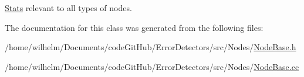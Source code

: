 \hyperlink{class_stats}{Stats} relevant to all types of nodes. 



The documentation for this class was generated from the following files\+:\begin{DoxyCompactItemize}
\item 
/home/wilhelm/\+Documents/code\+Git\+Hub/\+Error\+Detectors/src/\+Nodes/\hyperlink{_node_base_8h}{Node\+Base.\+h}\item 
/home/wilhelm/\+Documents/code\+Git\+Hub/\+Error\+Detectors/src/\+Nodes/\hyperlink{_node_base_8cc}{Node\+Base.\+cc}\end{DoxyCompactItemize}
